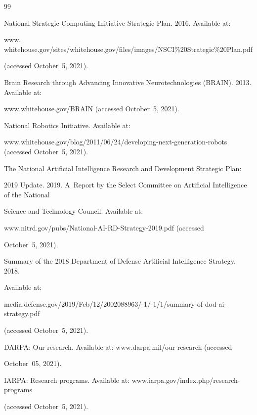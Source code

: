 {{\begin{thebibliography}{99}


National Strategic Computing Initiative Strategic Plan. 2016. Available at:


     {\sf


www. whitehouse.gov/sites/whitehouse.gov/files/images/NSCI\%20Strategic\%20Plan.pdf} (accessed October~5, 2021).




Brain Research through Advancing Innovative Neurotechnologies (BRAIN). 2013. Available at:


     {\sf www.whitehouse.gov/BRAIN} (accessed October~5, 2021).




National Robotics Initiative. Available at:


     {\sf www.whitehouse.gov/blog/2011/06/24/\linebreak developing-next-generation-robots} (accessed October~5, 2021).




The National Artificial Intelligence Research and Development Strategic Plan:


2019 Update. 2019. A~Report by the Select Committee on Artificial Intelligence of the National


Science and Technology Council. Available at:


     {\sf www.nitrd.gov/pubs/National-AI-RD-Strategy-2019.pdf} (accessed


October~5, 2021).




Summary of the 2018 Department of Defense Artificial Intelligence Strategy. 2018.


Available at:


     {\sf media.defense.gov/2019/Feb/12/2002088963/-1/-1/1/summary-of-dod-ai-strategy.pdf}


      (accessed October~5, 2021).




DARPA: Our research. Available at: {\sf www.darpa.mil/our-research} (accessed


October~05, 2021).




IARPA: Research programs. Available at: {\sf www.iarpa.gov/index.php/research-programs} 


(accessed October~5, 2021).



\end{thebibliography}}}
